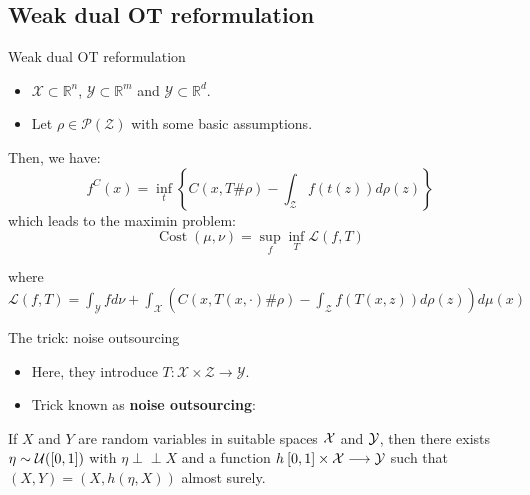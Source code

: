 \documentclass{beamer}
\newcommand{\R}{\mathbb{R}}
\DeclareMathOperator*{\Cost}{\text{Cost}}
\newcommand{\indep}{\perp \!\!\! \perp}
\begin{document}
\subsection{Weak dual OT reformulation}
\begin{frame}{Weak dual OT reformulation}
\begin{itemize}
    \item $\mathcal{X}\subset\R^n$, $\mathcal{Y}\subset\R^m$ and $\mathcal{Y}\subset\R^d$.
    \item Let $\rho\in \mathcal{P}(\mathcal{Z})$ with some basic assumptions.
\end{itemize}
Then, we have:
\begin{equation}
    f^C(x)=\inf_t \left\{C(x, T\#\rho)-\int_{\mathcal{Z}}f(t(z))d\rho(z)\right\}
\end{equation}
which leads to the maximin problem:
\begin{equation}
\Cost(\mu,\nu) = \sup_{f} \inf_{T} \mathcal{L}(f,T)
\end{equation}

where
$\mathcal{L}(f,T) = \int_{\mathcal{Y}}fd\nu + \int_{\mathcal{X}} \left( C(x, T(x,\cdot)\#\rho)-\int_{\mathcal{Z}}f(T(x,z))d\rho(z)\right)d\mu(x)$
\end{frame}

\begin{frame}{The trick: noise outsourcing}
\begin{itemize}
    \item Here, they introduce $T:\mathcal{X}\times\mathcal{Z}\to\mathcal{Y}$.
    \item Trick known as \textbf{noise outsourcing}:
\end{itemize}

\begin{theorem}
    If $X$ and $Y$ are random variables in suitable spaces ${\cal X}$ and ${\cal Y}$, then there exists $\eta\sim {\cal U}([0,1])$ with $\eta \indep X$ and a function $h\: [0, 1]\times {\cal X} \longrightarrow {\cal Y}$ such that $(X, Y) = (X, h(\eta, X))$ almost surely.
\end{theorem}
\end{frame}
\end{document}

